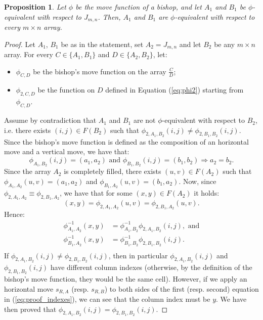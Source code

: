 \documentclass{amsart}
\newtheorem{prop}{Proposition}[section]
\theoremstyle{definition}
\numberwithin{equation}{section}
\begin{document}
\begin{prop}
	Let $\phi$ be the move function of a bishop, and let $A_1$ and $B_1$ be $\phi$-equivalent  with respect to $J_{m,n}$. Then, $A_1$ and $B_1$ are $\phi$-equivalent with respect to every $m \times n$ array. 
\end{prop}
\begin{proof}
Let $A_1$, $B_1$ be as in the statement, set $A_2=J_{m,n}$ and let $B_2$ be any $m \times n$ array. For every $C \in \{A_1,B_1\}$ and $D \in \{A_2,B_2\}$, let:
\begin{itemize}
	\item $\phi_{C,D}$ be the bishop's move function on the array $\frac{C}{D}$;
	\item $\phi_{2,C,D}$ be the function on $D$ defined in Equation (\ref{eq:phi2}) starting from $\phi_{C,D}$.
\end{itemize} 
Assume by contradiction that $A_1$ and $B_1$ are not $\phi$-equivalent with respect to $B_2$, i.e. there exists $(i,j) \in F(B_2)$ such that $\phi_{2,A_1,B_2}(i,j) \neq \phi_{2,B_1,B_2}(i,j)$. Since the bishop's move function is defined as the composition of an horizontal move and a vertical move, we have that:
\[
		\phi_{A_1,B_2} (i,j) = (a_1,a_2) \text{ and } \phi_{B_1,B_2} (i,j) = (b_1,b_2) \Rightarrow a_2 = b_2.
\]
Since the array $A_2$ is completely filled, there exists $(u,v) \in F(A_2)$ such that $\phi_{A_1,A_2}(u,v) = (a_1,a_2)$ and $\phi_{B_1,A_2}(u,v) = (b_1,a_2)$. Now, since $\phi_{2,A_1,A_2} \equiv \phi_{2,B_1,A_2}$, we have that for some $(x,y) \in F(A_2)$ it holds:
\[
	(x,y)=\phi_{2,A_1,A_2}(u,v) = \phi_{2,B_1,A_2}(u,v).
\]
Hence:
\begin{equation} \label{eq:proof_indexes}
\begin{aligned}
		\phi^{-1}_{A_1,A_2}(x,y) &= \phi^{-1}_{A_1,B_2} \phi_{2,A_1,B_2} (i,j), \text{ and} \\
		\phi^{-1}_{B_1,A_2}(x,y) &= \phi^{-1}_{B_1,B_2} \phi_{2,B_1,B_2} (i,j). \\
\end{aligned}		
\end{equation}
If $\phi_{2,A_1,B_2}(i,j) \neq \phi_{2,B_1,B_2}(i,j)$, then in particular $\phi_{2,A_1,B_2}(i,j)$ and $ \phi_{2,B_1,B_2}(i,j)$ have different column indexes (otherwise, by the definition of the bishop's move function, they would be the same cell). However, if we apply an horizontal move $s_{R,A}$ (resp. $s_{R,B}$) to both sides of the first (resp. second) equation in (\ref{eq:proof_indexes}), we can see that the column index must be $y$. We have then proved that $\phi_{2,A_1,B_2}(i,j) = \phi_{2,B_1,B_2}(i,j)$.
\end{proof}
\end{document}
